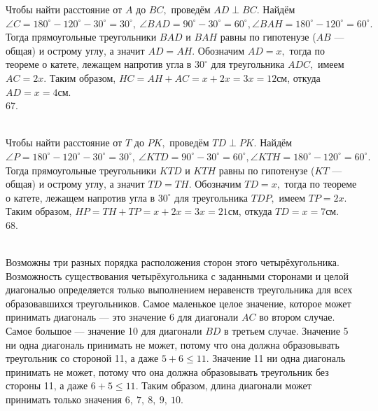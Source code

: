 \documentclass[12pt]{article}
\begin{document}
Чтобы найти расстояние от $A$ до $BC,$ проведём $AD\perp BC.$ Найдём $\angle C=180^\circ-120^\circ-30^\circ=30^\circ,\ \angle BAD=90^\circ-30^\circ=60^\circ, \angle BAH=180^\circ-120^\circ=60^\circ.$ Тогда прямоугольные треугольники $BAD$ и $BAH$ равны по гипотенузе ($AB$ --- общая) и острому углу, а значит $AD=AH.$ Обозначим $AD=x,$ тогда по теореме о катете, лежащем напротив угла в $30^\circ$ для треугольника $ADC,$ имеем $AC=2x.$ Таким образом, $HC=AH+AC=x+2x=3x=12$см, откуда $AD=x=4$см.\\
67. \begin{figure}[ht!]
\end{figure}\\
Чтобы найти расстояние от $T$ до $PK,$ проведём $TD\perp PK.$ Найдём $\angle P=180^\circ-120^\circ-30^\circ=30^\circ,\ \angle KTD=90^\circ-30^\circ=60^\circ, \angle KTH=180^\circ-120^\circ=60^\circ.$ Тогда прямоугольные треугольники $KTD$ и $KTH$ равны по гипотенузе ($KT$ --- общая) и острому углу, а значит $TD=TH.$ Обозначим $TD=x,$ тогда по теореме о катете, лежащем напротив угла в $30^\circ$ для треугольника $TDP,$ имеем $TP=2x.$ Таким образом, $HP=TH+TP=x+2x=3x=21$см, откуда $TD=x=7$см.\\
68. \begin{figure}[ht!]
\end{figure}\\
Возможны три разных порядка расположения сторон этого четырёхугольника. Возможность существования четырёхугольника с заданными сторонами и целой диагональю определяется только выполнением неравенств треугольника для всех образовавшихся треугольников. Самое маленькое целое значение, которое может принимать диагональ --- это значение 6 для диагонали $AC$ во втором случае. Самое большое --- значение 10 для диагонали $BD$ в третьем случае. Значение 5 ни одна диагональ принимать не может, потому что она должна образовывать треугольник со стороной 11, а даже $5+6\leqslant11.$ Значение 11 ни одна диагональ принимать не может, потому что она должна образовывать треугольник без стороны 11, а даже $6+5\leqslant11.$ Таким образом, длина диагонали может принимать только значения $6,\ 7,\ 8,\ 9,\ 10.$\\
\end{document}
